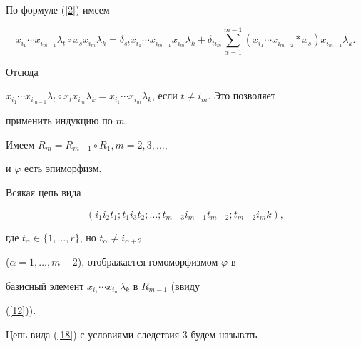 \begin{pf} По формуле (\ref{2}) имеем


\begin{equation}\label{17}


x_{i_1}\dotsb x_{i_{m-1}}\lambda _t \circ x_sx_{i_m}\lambda _k =


\delta _{st} x_{i_1}\dotsb x_{i_{m-1}}x_{i_m}\lambda _k + 


\delta _{ti_m}\sum _{\alpha =1}^{m-1}(x_{i_1}\dotsb x_{i_{m-2}} * x_s)


x_{i_{m-1}}\lambda _k.


\end{equation}


Отсюда


$x_{i_1}\dotsb x_{i_{m-1}}\lambda _t \circ x_tx_{i_m}\lambda _k =


x_{i_1}\dotsb x_{i_m}\lambda _k$, если $t\ne i_m$. Это позволяет


применить индукцию по $m$.


\end{pf}





\begin{cor} Имеем $R_m=R_{m-1}\circ R_1, m=2,3,\dotsc,$


и $\varphi $ есть эпиморфизм.


\end{cor}





\begin{cor} Всякая цепь вида


\begin{equation}\label{18}


(i_1i_2t_1;t_1i_3t_2;\dotsc ;t_{m-3}i_{m-1}t_{m-2};t_{m-2}i_mk),


\end{equation}


где $t_{\alpha }\in \{1,\dotsc ,r\}$, но $t_{\alpha }\ne i_{\alpha +2}$


($\alpha =1,\dotsc ,m-2$), отображается гомоморфизмом $\varphi $ в


базисный элемент $x_{i_1}\dotsb x_{i_m}\lambda _k$ в $R_{m-1}$ (ввиду


(\ref{12})).


\end{cor}





Цепь вида (\ref{18}) с условиями следствия 3 будем называть


